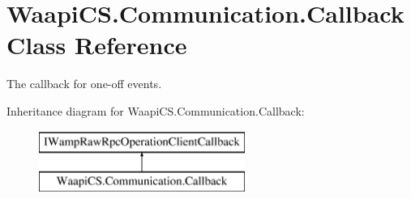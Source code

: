 \hypertarget{class_waapi_c_s_1_1_communication_1_1_callback}{}\section{Waapi\+C\+S.\+Communication.\+Callback Class Reference}
\label{class_waapi_c_s_1_1_communication_1_1_callback}


The callback for one-\/off events.  


Inheritance diagram for Waapi\+C\+S.\+Communication.\+Callback\+:\begin{figure}[H]
\begin{center}
\leavevmode
\includegraphics[height=2.000000cm]{class_waapi_c_s_1_1_communication_1_1_callback}
\end{center}
\end{figure}
